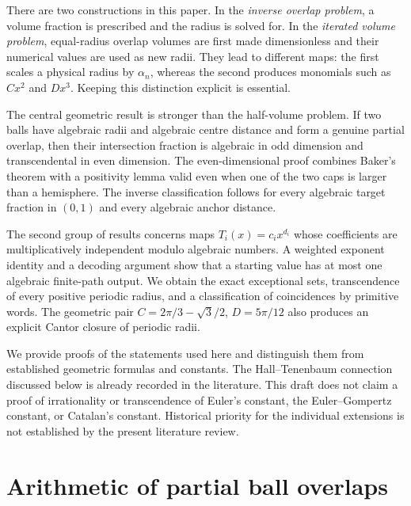 \documentclass[11pt,a4paper]{article}
\numberwithin{equation}{section}
\theoremstyle{definition}
\theoremstyle{remark}
\begin{document}
There are two constructions in this paper. In the \emph{inverse overlap problem}, a volume fraction is prescribed and the radius is solved for. In the \emph{iterated volume problem}, equal-radius overlap volumes are first made dimensionless and their numerical values are used as new radii. They lead to different maps: the first scales a physical radius by $\alpha_n$, whereas the second produces monomials such as $Cx^2$ and $Dx^3$. Keeping this distinction explicit is essential.

The central geometric result is stronger than the half-volume problem. If two balls have algebraic radii and algebraic centre distance and form a genuine partial overlap, then their intersection fraction is algebraic in odd dimension and transcendental in even dimension. The even-dimensional proof combines Baker's theorem with a positivity lemma valid even when one of the two caps is larger than a hemisphere. The inverse classification follows for every algebraic target fraction in $(0,1)$ and every algebraic anchor distance.

The second group of results concerns maps $T_i(x)=c_i x^{d_i}$ whose coefficients are multiplicatively independent modulo algebraic numbers. A weighted exponent identity and a decoding argument show that a starting value has at most one algebraic finite-path output. We obtain the exact exceptional sets, transcendence of every positive periodic radius, and a classification of coincidences by primitive words. The geometric pair $C=2\pi/3-\sqrt3/2$, $D=5\pi/12$ also produces an explicit Cantor closure of periodic radii.

We provide proofs of the statements used here and distinguish them from established geometric formulas and constants. The Hall--Tenenbaum connection discussed below is already recorded in the literature. This draft does not claim a proof of irrationality or transcendence of Euler's constant, the Euler--Gompertz constant, or Catalan's constant. Historical priority for the individual extensions is not established by the present literature review.

\section{Arithmetic of partial ball overlaps}\label{sec:lenses}
\end{document}
